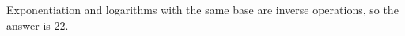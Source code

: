 Exponentiation and logarithms with the same base are inverse operations, so the answer is $\boxed{22}$.
